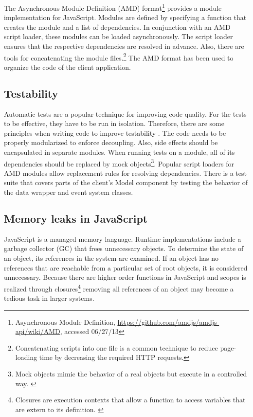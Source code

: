 The Asynchronous Module Definition (AMD) format\footnote{Asynchronous Module Definition, \url{https://github.com/amdjs/amdjs-api/wiki/AMD}, accessed 06/27/13} provides a module implementation for Ja\-va\-Script. Modules are defined by specifying a function that creates the module and a list of dependencies. In conjunction with an AMD script loader, these modules can be loaded asynchronously. The script loader ensures that the respective dependencies are resolved in advance. Also, there are tools for concatenating the module files.\footnote{Concatenating scripts into one file is a common technique to reduce page-loading time by decreasing the required HTTP requests.} The AMD format has been used to organize the code of the client application.

\subsection{Testability}
Automatic tests are a popular technique for improving code quality. For the tests to be effective, they have to be run in isolation. Therefore, there are some principles when writing code to improve testability \cite{Trostler_2013}. The code needs to be properly modularized to enforce decoupling. Also, side effects should be encapsulated in separate modules. When running tests on a module, all of its dependencies should be replaced by mock objects\footnote{Mock objects mimic the behavior of a real objects but execute in a controlled way. \cite{Osherove_2009}}. Popular script loaders for AMD modules allow replacement rules for resolving dependencies. There is a test suite that covers parts of the client's Model component by testing the behavior of the data wrapper and event system classes.

\subsection{Memory leaks in JavaScript}
JavaScript is a managed-memory language. Runtime implementations include a garbage collector (GC) that frees unnecessary objects. To determine the state of an object, its references in the system are examined. If an object has no references that are reachable from a particular set of root objects, it is considered unnecessary. Because there are higher order functions in JavaScript and scopes is realized through closures\footnote{Closures are execution contexts that allow a function to access variables that are extern to its definition. \cite{Resig_2013}} removing all references of an object may become a tedious task in larger systems. 


